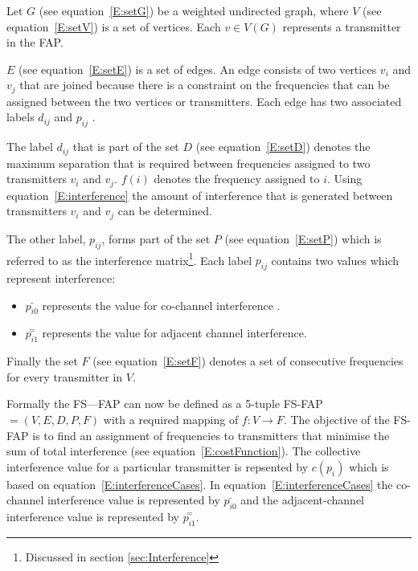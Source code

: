 Let $G$ (see equation~\ref{E:setG}) be a weighted undirected graph, where $V$ (see equation~\ref{E:setV}) is a set of vertices\cite{MontemanniThesis}. Each $v \in V(G)$ represents a transmitter in the FAP\cite{MontemanniThesis}. 

$E$ (see equation~\ref{E:setE}) is a set of edges\cite{MontemanniThesis}. An edge consists of two vertices $v_i$ and $v_j$ that are joined because there is a constraint on the frequencies that can be assigned between the two vertices or transmitter\cite{MontemanniThesis}s. Each edge has two associated labels $d_{ij}$ and $p_{ij}$ \cite{FAPOrientationModel,TabuMontemanniSmith}. 

The label $d_{ij}$ that is part of the set $D$ (see equation~\ref{E:setD}) denotes the maximum separation that is required between frequencies assigned to two transmitters $v_i$ and $v_j$. $f(i)$ denotes the frequency assigned to $i$. Using equation~\ref{E:interference} the amount of interference that is generated between transmitters $v_i$ and $v_j$ can be determined\cite{FAPOrientationModel,TabuMontemanniSmith}.

The other label, $p_{ij}$, forms part of the set $P$ (see equation~\ref{E:setP}) which is referred to as the interference matrix\footnote{Discussed in section \ref{sec:Interference}}\cite{Eisenblatter}. Each label $p_{ij}$ contains two values which represent interference:
\begin{itemize}
\item $\bar{p_{i0}}$ represents the value for co-channel interference \cite{FAPOrientationModel,TabuMontemanniSmith}. 
\item $\overset{=}{p_{i1}}$ represents the value for adjacent channel interference\cite{FAPOrientationModel,TabuMontemanniSmith}.
\end{itemize}

Finally the set $F$ (see equation~\ref{E:setF}) denotes a set of consecutive frequencies for every transmitter in $V$\cite{FAPOrientationModel,TabuMontemanniSmith}.

Formally the FS---FAP can now be defined as a 5-tuple FS-FAP $= (V,E,D,P,F)$ with a required mapping of $f: V \rightarrow F$\cite{TabuMontemanniSmith}. The objective of the FS-FAP is to find an assignment of frequencies to transmitters that minimise the sum of total interference (see equation~\ref{E:costFunction}). The collective interference value for a particular transmitter is repsented by $c(p_i)$ which is based on equation~\ref{E:interferenceCases}. In equation~\ref{E:interferenceCases} the co-channel interference value is represented by $\bar{p_{i0}}$ and the adjacent-channel interference value is represented by $\overset{=}{p_{i1}}$.

